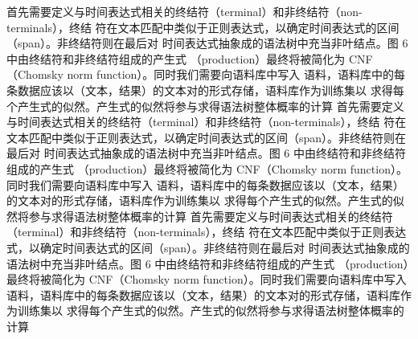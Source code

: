 首先需要定义与时间表达式相关的终结符（terminal）和非终结符（non-terminals），终结
符在文本匹配中类似于正则表达式，以确定时间表达式的区间（span）。非终结符则在最后对
时间表达式抽象成的语法树中充当非叶结点。图 6 中由终结符和非终结符组成的产生式
（production）最终将被简化为 CNF（Chomsky norm function）。同时我们需要向语料库中写入
语料，语料库中的每条数据应该以（文本，结果）的文本对的形式存储，语料库作为训练集以
求得每个产生式的似然。产生式的似然将参与求得语法树整体概率的计算
首先需要定义与时间表达式相关的终结符（terminal）和非终结符（non-terminals），终结
符在文本匹配中类似于正则表达式，以确定时间表达式的区间（span）。非终结符则在最后对
时间表达式抽象成的语法树中充当非叶结点。图 6 中由终结符和非终结符组成的产生式
（production）最终将被简化为 CNF（Chomsky norm function）。同时我们需要向语料库中写入
语料，语料库中的每条数据应该以（文本，结果）的文本对的形式存储，语料库作为训练集以
求得每个产生式的似然。产生式的似然将参与求得语法树整体概率的计算
首先需要定义与时间表达式相关的终结符（terminal）和非终结符（non-terminals），终结
符在文本匹配中类似于正则表达式，以确定时间表达式的区间（span）。非终结符则在最后对
时间表达式抽象成的语法树中充当非叶结点。图 6 中由终结符和非终结符组成的产生式
（production）最终将被简化为 CNF（Chomsky norm function）。同时我们需要向语料库中写入
语料，语料库中的每条数据应该以（文本，结果）的文本对的形式存储，语料库作为训练集以
求得每个产生式的似然。产生式的似然将参与求得语法树整体概率的计算



